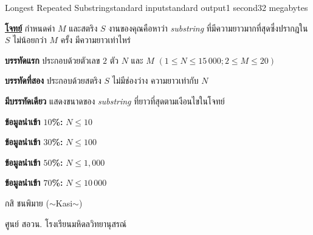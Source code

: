 \documentclass[11pt,a4paper]{article}
\begin{document}
\begin{problem}{Longest Repeated Substring}{standard input}{standard output}{1 second}{32 megabytes}

\bigskip
\underline{\textbf{โจทย์}}  กำหนดค่า $M$ และสตริง $S$ งานของคุณคือหาว่า \textit{substring} ที่มีความยาวมากที่สุดซึ่งปรากฎใน $S$ ไม่น้อยกว่า $M$ ครั้ง มีความยาวเท่าไหร่


\InputFile

\textbf{บรรทัดแรก} ประกอบด้วยตัวเลข $2$ ตัว $N$ และ $M$ $( 1 \leq N \leq 15\,000; 2  \leq M \leq 20 )$

\textbf{บรรทัดที่สอง} ประกอบด้วยสตริง $S$ ไม่มีช่องว่าง ความยาวเท่ากับ $N$


\OutputFile

\textbf{มีบรรทัดเดียว} แสดงขนาดของ \textit{substring} ที่ยาวที่สุดตามเงือนไขในโจทย์

\Examples

\begin{example}
%
%
\end{example}

\Scoring

\textbf{ข้อมูลนำเข้า $10$\%:} $N \leq 10$

\textbf{ข้อมูลนำเข้า $30$\%:} $N \leq 100$

\textbf{ข้อมูลนำเข้า $50$\%:} $N \leq 1,000$

\textbf{ข้อมูลนำเข้า $70$\%:} $N \leq 10\,000$

                
\Source

กสิ ชนพิมาย ($\sim$Kasi$\sim$)

ศูนย์ สอวน. โรงเรียนมหิดลวิทยานุสรณ์

\end{problem}
\end{document}
